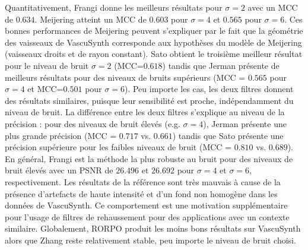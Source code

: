Quantitativement, Frangi donne les meilleurs résultats pour $\sigma=2$ avec un MCC de $0.634$. Meijering  atteint un MCC de $0.603$ pour $\sigma=4$ et $0.565$ pour $\sigma=6$. Ces bonnes performances de Meijering peuvent s'expliquer par le fait que la géométrie des vaisseaux de VascuSynth corresponde aux hypothèses du modèle de Meijering (vaisseaux droits et de rayon constant). Sato obtient le troisième meilleur résultat pour le niveau de bruit $\sigma=2$ (MCC=$0.618$) tandis que Jerman présente de meilleurs résultats pour des niveaux de bruits supérieurs (MCC = $0.565$ pour $\sigma=4$ et MCC=$0.501$ pour $\sigma = 6$). Peu importe les cas, les deux filtres donnent des résultats similaires, puisque leur sensibilité est proche, indépendamment du niveau de bruit. La différence entre les deux filtres s'explique au niveau de la précision : pour des niveaux de bruit élevés (e.g. $\sigma=4$), Jerman présente une plus grande précision (MCC = $0.717$ vs. $0.661$) tandis que Sato présente une précision supérieure pour les faibles niveaux de bruit (MCC = $0.810$ vs. $0.689$). En général, Frangi est la méthode la plus robuste au bruit pour des niveaux de bruit élevés avec un PSNR de $26.496$ et $26.692$ pour $\sigma=4$ et $\sigma=6$, respectivement. Les résultats de la référence sont très mauvais à cause de la présence d'artefacts de haute intensité et d'un fond non homogène dans les données de VascuSynth. Ce comportement est une motivation supplémentaire pour l'usage de filtres de rehaussement pour des applications avec un contexte similaire. Globalement, RORPO produit les moins bons résultats sur VascuSynth alors que Zhang reste relativement stable, peu importe le niveau de bruit choisi.

